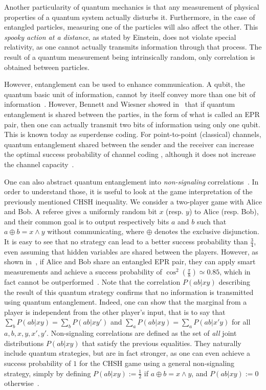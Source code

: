 Another particularity of quantum mechanics is that any measurement of physical properties of a quantum system actually disturbs it. Furthermore, in the case of entangled particles, measuring one of the particles will also affect the other. This \emph{spooky action at a distance}, as stated by Einstein, does not violate special relativity, as one cannot actually transmits information through that process. The result of a quantum measurement being intrinsically random, only correlation is obtained between particles.

However, entanglement can be used to enhance communication. A qubit, the quantum basic unit of information, cannot by itself convey more than one bit of information~\cite{Holevo73}. However, Bennett and Wiesner showed in~\cite{BW92} that if quantum entanglement is shared between the parties, in the form of what is called an EPR pair, then one can actually transmit two bits of information using only one qubit. This is known today as superdense coding. For point-to-point (classical) channels, quantum entanglement shared between the sender and the receiver can increase the optimal success probability of channel coding \cite{CLMW10,PLMKR11}, although it does not increase the channel capacity~\cite{BBCJPW93,BSST99}. 

One can also abstract quantum entanglement into \emph{non-signaling} correlations~\cite{Tsirelson80,PR94}. In order to understand those, it is useful to look at the game interpretation of the previously mentioned CHSH inequality. We consider a two-player game with Alice and Bob. A referee gives a uniformly random bit $x$ (resp. $y$) to Alice (resp. Bob), and their common goal is to output respectively bits $a$ and $b$ such that $a \oplus b = x \land y$ without communicating, where $\oplus$ denotes the exclusive disjunction. It is easy to see that no strategy can lead to a better success probability than $\frac{3}{4}$, even assuming that hidden variables are shared between the players. However, as shown in~\cite{CHSH69}, if Alice and Bob share an entangled EPR pair, they can apply smart measurements and achieve a success probability of $\cos^2\left(\frac{\pi}{8}\right) \simeq 0.85$, which in fact cannot be outperformed~\cite{Tsirelson80}. Note that the correlation $P(ab|xy)$ describing the result of this quantum strategy confirms that no information is transmitted using quantum entanglement. Indeed, one can show that the marginal from a player is independent from the other player's input, that is to say that $\sum_bP(ab|xy)=\sum_bP(ab|xy')$ and $\sum_aP(ab|xy)=\sum_aP(ab|x'y)$ for all $a,b,x,y,x',y'$. Non-signaling correlations are defined as the set of \emph{all} joint distributions $P(ab|xy)$ that satisfy the previous equalities. They naturally include quantum strategies, but are in fact stronger, as one can even achieve a success probability of $1$ for the CHSH game using a general non-signaling strategy, simply by defining $P(ab|xy):=\frac{1}{2}$ if $a \oplus b = x \land y$, and $P(ab|xy):=0$ otherwise~\cite{PR94}.

